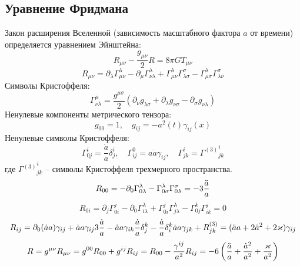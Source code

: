 \documentclass[12pt]{article}
\theoremstyle{definition}
\begin{document}
\subsection{Уравнение Фридмана}
Закон расширения Вселенной (зависимость масштабного фактора $a$ от времени) определяется уравнением Эйнштейна:
    \begin{equation}
        R_{\mu\nu}-\frac{g_{\mu\nu}}{2}R=8\pi GT_{\mu\nu}
    \end{equation}
    \begin{equation}
        R_{\mu\nu}=\partial_\lambda\Gamma^\lambda_{\mu\nu}-\partial_\mu\Gamma^\lambda_{\nu\lambda}+\Gamma^\lambda_{\mu\nu}\Gamma^\sigma_{\lambda\sigma}-\Gamma^\lambda_{\mu\sigma}\Gamma^\sigma_{\lambda\nu}
    \end{equation}
    Символы Кристоффеля:
    \begin{equation}
        \Gamma^\mu_{\nu\lambda}=\frac{g^{\mu\sigma}}{2}(\partial_\nu g_{\lambda\sigma}+\partial_\lambda g_{\nu\sigma}-\partial_\sigma g_{\nu\lambda})
    \end{equation}
    Ненулевые компоненты метрического тензора:
    \begin{equation}
        g_{00}=1,\quad g_{ij}=-a^2(t)\gamma_{ij}(x)
    \end{equation}
    Ненулевые символы Кристоффеля:
    \begin{equation}
        \Gamma^i_{0j}=\frac{\Dot{a}}{a}\delta^i_j,\quad\Gamma^0_{ij}=a\dot{a}\gamma_{ij},\quad\Gamma^i_{jk}={\Gamma^{(3)}}^i_{jk}
    \end{equation}
    где ${\Gamma^{(3)}}^i_{jk}$ -- символы Кристоффеля трехмерного пространства.
    \begin{equation}
        R_{00}=-\partial_0\Gamma^\lambda_{0\lambda}-\Gamma^\lambda_{0\sigma}\Gamma^\sigma_{0\lambda}=-3\frac{\Ddot{a}}{a}
    \end{equation}
    \begin{equation}
        R_{0i}=\partial_j\Gamma^j_{0i}-\partial_0\Gamma^\lambda_{i\lambda}+\Gamma^j_{0i}\Gamma^\lambda_{j\lambda}-\Gamma^k_{0j}\Gamma^j_{ik}=0
    \end{equation}
    \begin{equation}
        R_{ij}=\partial_0(\dot{a}a)\gamma_{ij}+\dot{a}a\gamma_{ij}3\frac{\dot{a}}{a}-\dot{a}a\gamma_{ik}\frac{\dot{a}}{a}\delta^k_j-\frac{\dot{a}}{a}\delta^k_i\dot{a}a\gamma_{jk}+R^{(3)}_{jk}=(\Ddot{a}a+2\dot{a}^2+2\varkappa)\gamma_{ij}
    \end{equation}
    \begin{equation}
        R=g^{\mu\nu}R_{\mu\nu}=g^{00}R_{00}+g^{ij}R_{ij}=R_{00}-\frac{\gamma^{ij}}{a^2}R_{ij}=-6\left(\frac{\Ddot{a}}{a}+\frac{\dot{a}^2}{a^2}+\frac{\varkappa}{a^2}\right)
    \end{equation}
\end{document}
